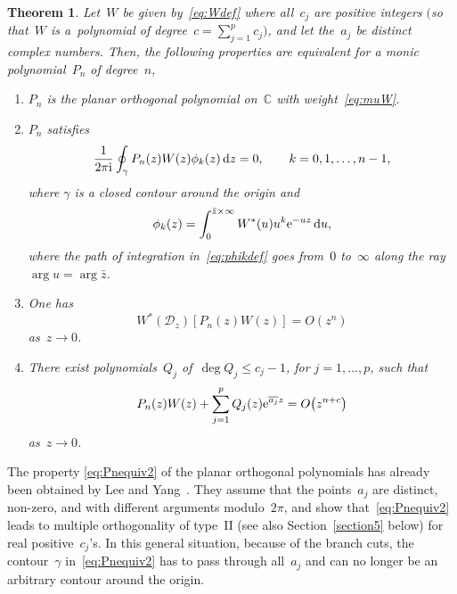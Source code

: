 \documentclass[pdftex]{sigma}
\numberwithin{equation}{section}
\newtheorem{Theorem}{Theorem}[section]
\newcommand*{\Cset}{\mathbb{C}} %
\begin{document}
 \begin{Theorem}
 \label{thm:theo1}
 Let~$W$ be given by~\eqref{eq:Wdef} where all~$c_j$ are positive integers $\big($so that~$W$ is a~polynomial of degree~$c = \sum_{j=1}^p c_j\big)$, and let the~$a_j$ be distinct complex numbers. Then, the following properties are equivalent for a monic polynomial~$P_n$ of degree~$n$,
 \begin{enumerate}
 \item[$(a)$] $P_n$ is the planar orthogonal polynomial on~$\Cset$ with weight~\eqref{eq:muW}.
 \item[$(b)$] $P_n$ satisfies
 \begin{equation}
 \label{eq:Pnequiv2}
 \frac{1}{2\pi {\rm i}} \oint_{\gamma} P_n(z) W(z) \phi_k(z)\, {\rm d}z = 0, \qquad k=0,1, \dots, n-1,
 \end{equation}
 where $\gamma$ is a closed contour around the origin and
 \begin{equation}
 \label{eq:phikdef}
 \phi_k(z) = \int_0^{\bar{z} \times \infty} W^*(u) u^k {\rm e}^{-uz}\, {\rm d}u,
 \end{equation}
 where the path of integration in~\eqref{eq:phikdef} goes from~$0$ to~$\infty$ along the ray $\arg u = \arg \bar{z}$.
 \item[$(c)$] One has
 \begin{equation}
 \label{eq:Pnequiv3}
 W^*(\mathscr{D}_z) \left[ P_n(z) W(z) \right] = O(z^n)
 \end{equation}
 as~$z \to 0$.
 \item[$(d)$] There exist polynomials~$Q_j$ of~$\deg Q_j \leq c_j-1$, for $j=1, \dots, p$, such that
 \begin{equation}
 \label{eq:Pnequiv4}
 P_n(z) W(z) + \sum_{j=1}^p Q_j(z) {\rm e}^{\overline{a_j} z} = O\big(z^{n + c}\big)
 \end{equation}
 as~$z \to 0$.
 \end{enumerate}
 \end{Theorem}



 \begin{Remark}
 The property \eqref{eq:Pnequiv2} of the planar orthogonal polynomials has already been obtained by Lee and Yang~\cite{LY2}. They assume that the points~$a_j$ are distinct, non-zero, and with different arguments modulo~$2\pi$, and show that~\eqref{eq:Pnequiv2} leads to multiple orthogonality of type~II (see also Section~\ref{section5} below) for real positive~$c_j$'s. In this general situation, because of the branch cuts, the contour~$\gamma$ in~\eqref{eq:Pnequiv2} has to pass through all~$a_j$ and can no longer be an arbitrary contour around the origin.
 \end{Remark}
\end{document}
